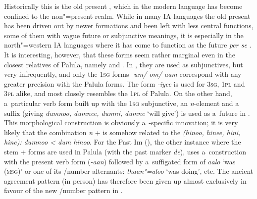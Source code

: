 Historically this is the old present , which in the modern language has become confined to the non"=present  realm. While in many IA languages the old present has been driven out by newer formations and been left with less central functions, some of them with vague future or subjunctive meanings, it is especially in the north"=western IA languages where it has come to function as the future \textit{per se} \citep[288]{masica1991}. It is interesting, however, that these forms seem rather marginal even in the closest relatives of Palula, namely \iliSauji and \iliKalkoti. In \iliSauji, they are used as subjunctives, but very infrequently, and only the \textsc{1sg} forms \textit{-um/-om/-aam} correspond with any greater precision with the Palula forms. The form \textit{-iyee} is used for \textsc{3sg}, \textsc{1pl} and \textsc{3pl} alike, and most closely resembles the \textsc{1pl} of Palula. On the other hand, a~particular verb form built up with the \textsc{1sg} subjunctive, an \textit{n}-element and a~ suffix (giving \textit{dumnoo, dumnee, dumni, dumne} `will give') is used as a~future in \iliSauji. This morphological construction is obviously a~\iliSauji-specific innovation; it is very likely that the combination \textit{n} +  is somehow related to the  \textit{(hinoo, hinee, hini, hine):} \textit{dumnoo {\textless} dum hinoo}. For the Past Im (), the other instance where the  stem +  forms are used in Palula (with the past  marker \textit{de}), \iliSauji uses a~construction with the present  verb form (\textit{-aan}) followed by a~suffigated form of \textit{aalo} `was \textsc{(msg)}' or one of its /number alternants: \textit{thaan"=aloo} `was doing', etc. The ancient agreement pattern (in person) has therefore been given up almost exclusively in favour of the new /number pattern in \iliSauji \citep[46--54]{buddruss1967}.


